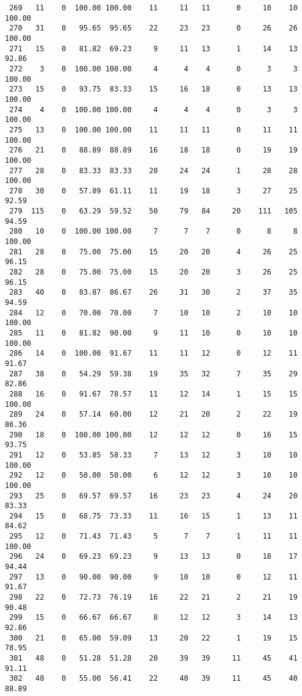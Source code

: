 \begin{verbatim}
 269   11    0  100.00 100.00    11     11   11      0     10    10   100.00
 270   31    0   95.65  95.65    22     23   23      0     26    26   100.00
 271   15    0   81.82  69.23     9     11   13      1     14    13    92.86
 272    3    0  100.00 100.00     4      4    4      0      3     3   100.00
 273   15    0   93.75  83.33    15     16   18      0     13    13   100.00
 274    4    0  100.00 100.00     4      4    4      0      3     3   100.00
 275   13    0  100.00 100.00    11     11   11      0     11    11   100.00
 276   21    0   88.89  88.89    16     18   18      0     19    19   100.00
 277   28    0   83.33  83.33    20     24   24      1     28    28   100.00
 278   30    0   57.89  61.11    11     19   18      3     27    25    92.59
 279  115    0   63.29  59.52    50     79   84     20    111   105    94.59
 280   10    0  100.00 100.00     7      7    7      0      8     8   100.00
 281   28    0   75.00  75.00    15     20   20      4     26    25    96.15
 282   28    0   75.00  75.00    15     20   20      3     26    25    96.15
 283   40    0   83.87  86.67    26     31   30      2     37    35    94.59
 284   12    0   70.00  70.00     7     10   10      2     10    10   100.00
 285   11    0   81.82  90.00     9     11   10      0     10    10   100.00
 286   14    0  100.00  91.67    11     11   12      0     12    11    91.67
 287   38    0   54.29  59.38    19     35   32      7     35    29    82.86
 288   16    0   91.67  78.57    11     12   14      1     15    15   100.00
 289   24    0   57.14  60.00    12     21   20      2     22    19    86.36
 290   18    0  100.00 100.00    12     12   12      0     16    15    93.75
 291   12    0   53.85  58.33     7     13   12      3     10    10   100.00
 292   12    0   50.00  50.00     6     12   12      3     10    10   100.00
 293   25    0   69.57  69.57    16     23   23      4     24    20    83.33
 294   15    0   68.75  73.33    11     16   15      1     13    11    84.62
 295   12    0   71.43  71.43     5      7    7      1     11    11   100.00
 296   24    0   69.23  69.23     9     13   13      0     18    17    94.44
 297   13    0   90.00  90.00     9     10   10      0     12    11    91.67
 298   22    0   72.73  76.19    16     22   21      2     21    19    90.48
 299   15    0   66.67  66.67     8     12   12      3     14    13    92.86
 300   21    0   65.00  59.09    13     20   22      1     19    15    78.95
 301   48    0   51.28  51.28    20     39   39     11     45    41    91.11
 302   48    0   55.00  56.41    22     40   39     11     45    40    88.89

\end{verbatim}
